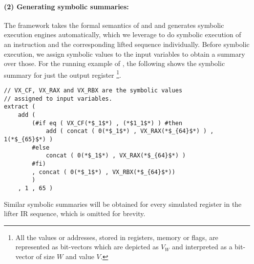 \paragraph{(2) Generating symbolic summaries:}
The \K framework takes the formal semantics of \ISA and \LLVM and generates 
symbolic execution engines automatically, which we leverage to do 
symbolic execution of an \ISA instruction and the corresponding lifted \LLVM sequence 
individually. Before symbolic execution, we assign symbolic values to the input 
variables to obtain a summary over those. For the running example of 
, the following shows the symbolic summary for just the 
output register \footnote{All the values or
    addresses, stored in registers, memory or
    flags, are represented as bit-vectors which are depicted
     as $V_W$ and interpreted as a bit-vector of size $W$
    and value $V$.}. 

\vspace{45pt}

\begin{lstlisting}[style=KRULE]
// VX_CF, VX_RAX and VX_RBX are the symbolic values
// assigned to input variables.
extract ( 
    add ( 
        (#if eq ( VX_CF(*$_1$*) , (*$1_1$*) ) #then 
            add ( concat ( 0(*$_1$*) , VX_RAX(*$_{64}$*) ) , 1(*$_{65}$*) ) 
        #else 
            concat ( 0(*$_1$*) , VX_RAX(*$_{64}$*) ) 
        #fi)
        , concat ( 0(*$_1$*) , VX_RBX(*$_{64}$*)) 
        ) 
    , 1 , 65 ) 
\end{lstlisting}

Similar symbolic summaries will be obtained for
 every simulated register in the lifter IR sequence,
which is omitted for brevity.


